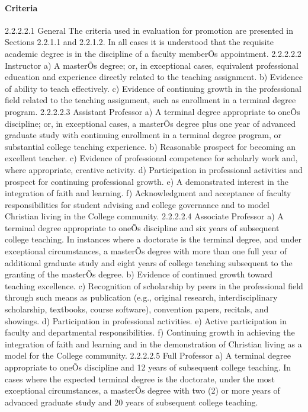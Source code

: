 \documentclass[letterpaper, 11pt]{article}
\begin{document}
			\paragraph{Criteria}
				2.2.2.2.1 General
				The criteria used in evaluation for promotion are presented in Sections 2.2.1.1 and 2.2.1.2. In all cases it is understood that the requisite academic degree is in the discipline of a faculty memberÕs appointment.
				2.2.2.2.2 Instructor
				a) A masterÕs degree; or, in exceptional cases, equivalent professional education and experience directly related to the teaching assignment.
				b) Evidence of ability to teach effectively.
				c) Evidence of continuing growth in the professional field related to the teaching assignment, such as enrollment in a terminal degree program.
				2.2.2.2.3 Assistant Professor
				a) A terminal degree appropriate to oneÕs discipline; or, in exceptional cases, a masterÕs degree plus one year of advanced graduate study with continuing enrollment in a terminal degree program, or substantial college teaching experience.
				b) Reasonable prospect for becoming an excellent teacher.
				c) Evidence of professional competence for scholarly work and, where appropriate, creative activity.
				d) Participation in professional activities and prospect for continuing professional growth.
				e) A demonstrated interest in the integration of faith and learning.
				f) Acknowledgment and acceptance of faculty responsibilities for student advising and college governance and to model Christian living in the College community.
				2.2.2.2.4 Associate Professor
				a) A terminal degree appropriate to oneÕs discipline and six years of subsequent college teaching. In instances where a doctorate is the terminal degree, and under exceptional circumstances, a masterÕs degree with more than one full year of additional graduate study and eight years of college teaching subsequent to the granting of the masterÕs degree.
				b) Evidence of continued growth toward teaching excellence.
				c) Recognition of scholarship by peers in the professional field through such means as publication (e.g., original research, interdisciplinary scholarship, textbooks, course software), convention papers, recitals, and showings.
				d) Participation in professional activities.
				e) Active participation in faculty and departmental responsibilities.
				f) Continuing growth in achieving the integration of faith and learning and in the demonstration of Christian living as a model for the College community.
				2.2.2.2.5 Full Professor
				a) A terminal degree appropriate to oneÕs discipline and 12 years of subsequent college teaching. In cases where the expected terminal degree is the doctorate, under the most exceptional circumstances, a masterÕs degree with two (2) or more years of advanced graduate study and 20 years of subsequent college teaching.
\end{document}
